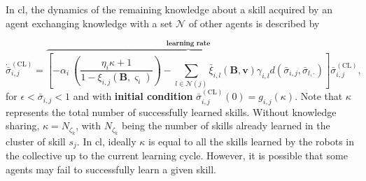 \documentclass[12pt]{article}
\begin{document}
In \ac{cl}, the dynamics of the remaining knowledge  about a skill acquired by an agent exchanging knowledge with a set $\mathcal{N}$ of other agents is described by

\begin{equation}\label{eq:collective_knowledge_dynamics}
	\dot{\bar{\sigma}}^{(\text{CL})}_{i,j} =
		\overbrace{\left[-\alpha_i\:\left( \frac{\eta_i \kappa + 1}{1 - \xi_{i,j}(\bm{B},\bm{\varsigma}_i)} \right)  - \sum\limits_{l \in \mathcal{N}(j)} \bar{\xi}_{i,l}(\bm{B},\bm{v}) \gamma_{i,l} d(\bar{\sigma}_{i,j},\bar{\sigma}_{l,\cdot})\right]}^{\textbf{learning rate}} \bar{\sigma}^{(\text{CL})}_{i,j},
\end{equation}
\noindent for $\epsilon < \bar{\sigma}_{i,j} < 1$ and with \textbf{initial condition} $\bar{\sigma}^{(\text{CL})}_{i,j}(0) = g_{i,j}\left(\kappa\right)$. Note that $\kappa$ represents the total number of successfully learned skills. Without knowledge sharing, $\kappa= N_{\zeta_k}$, with $N_{\zeta_k}$ being the number of skills already learned in the cluster of skill $s_j$. In \ac{cl}, ideally $\kappa$ is equal to all the skills learned by the robots in the collective up to the current learning cycle. However, it is possible that some agents may fail to successfully learn a given skill.
\end{document}
